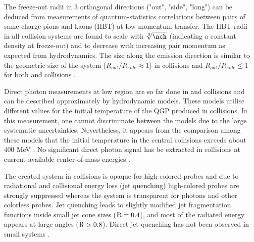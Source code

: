 \documentclass[../report.tex]{subfiles}
\begin{document}
The freeze-out radii in 3 orthogonal directions ("out", "side", "long") can be deduced from measurements of quantum-statistics correlations between pairs of same-charge pions and kaons (HBT) at low momentum transfer. The HBT radii in all collision systems are found to scale with $\sqrt[3]{\nch}$ (indicating a constant density at freeze-out) and to decrease with increasing pair momentum \kT as expected from hydrodynamics. The size along the emission direction is similar to the geometric size of the system ($R_{out}/R_{side} \approx 1$) in \PbPb collisions  \cite{Adam:2015vna,Adam:2015vja,Abelev:2014pja,CMS:2014mla,Acharya:2017qtq,Acharya:2017qtq} and $R_{out}/R_{side} \leq 1$ for both \pPb and \pp collisions \cite{Abelev:2014pja,Adam:2015pya,Aamodt:2011kd,CMS:2014mla,Aaboud:2017xpw}.

Direct photon measurements at low \pt region are so far done in \PbPb and \pp collisions and can be described approximately by hydrodynamic models. These models utilise different values for the initial temperature of the QGP produced in \PbPb collisions. In this measurement, one cannot discriminate between the models due to the large systematic uncertainties. Nevertheless, it appears from the comparison among these models that the initial temperature in the central \PbPb collisions exceeds about 400 MeV \cite{Adam:2015lda}. No significant direct photon signal has be extracted in \pp collisions at current available center-of-mass energies \cite{Acharya:2018dqe}. 

The created system in \PbPb collisions is opaque for high-\pt colored probes and due to radiational and collisional energy loss (jet quenching) high-\pt colored probes are strongly suppressed whereas the system is transparent for photons and other colorless probes. Jet quenching leads to slightly modified jet fragmentation functions inside small jet cone sizes ($\rm{R} = 0.4$), and most of the radiated energy appears at large angles ($\rm{R} > 0.8$). Direct jet quenching has not been observed in small systems \cite{Aad:2010bu,Aamodt:2010jd,Chatrchyan:2011sx,CMS:2012aa,Abelev:2012hxa,ALICE:2012ab,Aad:2014bxa,Adam:2015ewa,Aad:2015wga,Adam:2016jfp,Adam:2016xbp,Sirunyan:2017jic,Sirunyan:2016fcs,Sirunyan:2018jqr,Sirunyan:2018jju,Sirunyan:2018qec,Sirunyan:2017qhf,Khachatryan:2016tfj,Sirunyan:2017bsd,Aaboud:2017bzv,Aaboud:2017eww}. 
\end{document}
